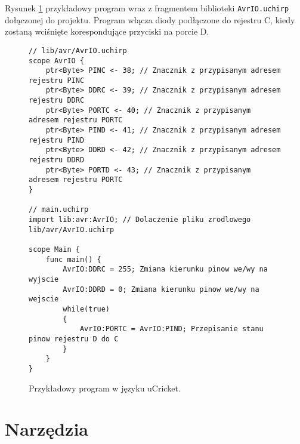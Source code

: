 Rysunek \ref{fig:lst:ucricket-example} przykładowy program wraz z fragmentem biblioteki \lstinline|AvrIO.uchirp| dołączonej do projektu. Program włącza diody podłączone do rejestru C, kiedy zostaną wciśnięte korespondujące przyciski na porcie D.
\begin{figure}
\centering
\begin{lstlisting}
// lib/avr/AvrIO.uchirp
scope AvrIO {
    ptr<Byte> PINC <- 38; // Znacznik z przypisanym adresem rejestru PINC
    ptr<Byte> DDRC <- 39; // Znacznik z przypisanym adresem rejestru DDRC
    ptr<Byte> PORTC <- 40; // Znacznik z przypisanym adresem rejestru PORTC
    ptr<Byte> PIND <- 41; // Znacznik z przypisanym adresem rejestru PIND
    ptr<Byte> DDRD <- 42; // Znacznik z przypisanym adresem rejestru DDRD
    ptr<Byte> PORTD <- 43; // Znacznik z przypisanym adresem rejestru PORTC
}

// main.uchirp
import lib:avr:AvrIO; // Dolaczenie pliku zrodlowego lib/avr/AvrIO.uchirp

scope Main {
	func main() {
		AvrIO:DDRC = 255; Zmiana kierunku pinow we/wy na wyjscie
		AvrIO:DDRD = 0; Zmiana kierunku pinow we/wy na wejscie
		while(true) 
        {
			AvrIO:PORTC = AvrIO:PIND; Przepisanie stanu pinow rejestru D do C
		}
	}
}
\end{lstlisting}
\caption{Przykładowy program w języku uCricket.}
\label{fig:lst:ucricket-example}
\end{figure}

\section{Narzędzia}

